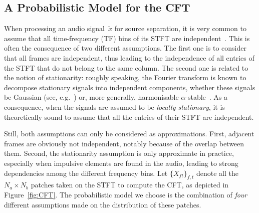 \subsection{A Probabilistic Model for the CFT}

\label{sub:separation}

When processing an audio signal~$\tilde{x}$ for source separation,
it is very common to assume that all time-frequency (TF) bins
of its STFT are independent~\cite{techreport_NMF,duong_TSALP2010,ozerov2012general,GP-USS-TSP}.
This is often the consequence of two different assumptions.
The first one is to consider that all frames are independent, thus
leading to the independence of all entries of the STFT that do not belong to the
same column. The second one is related to the notion of stationarity:
roughly speaking, the Fourier transform is known to decompose stationary
signals into independent components, whether these signals be Gaussian
(see, e.g.~\cite{GP-USS-TSP}) or, more generally, harmonisable $\alpha$-stable~\cite{alpha-wiener}.
As a consequence, when the signals are assumed to be \emph{locally stationary},
it is theoretically sound to assume that all the entries of
their STFT are independent.

Still, both assumptions can only be considered as approximations.
First, adjacent frames are obviously not independent, notably because
of the overlap between them. Second, the stationarity assumption is
only approximate in practice, especially when impulsive elements are
found in the audio, leading to strong dependencies among the different
frequency bins. Let $\{ X_{ft}\} _{f,t}$
denote all the $N_{a}\times N_{b}$ patches taken on the STFT to compute
the CFT, as depicted in Figure~\ref{fig:CFT}. The probabilistic
model we choose is the combination of \emph{four} different assumptions
made on the distribution of these patches.

